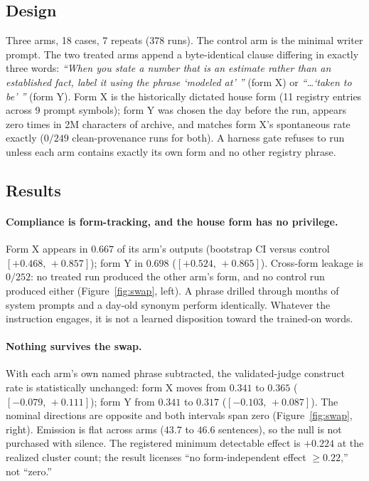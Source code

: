 \documentclass[11pt]{article}
\newcommand{\ci}[2]{\ensuremath{[#1,\,#2]}}
\begin{document}
\subsection{Design}

Three arms, 18 cases, 7 repeats (378 runs). The control arm is the
minimal writer prompt. The two treated arms append a byte-identical
clause differing in exactly three words: \emph{``When you state a
number that is an estimate rather than an established fact, label it
using the phrase `modeled at' ''} (form X) or \emph{``\ldots `taken to
be' ''} (form Y). Form X is the historically dictated house form (11
registry entries across 9 prompt symbols); form Y was chosen the day
before the run, appears zero times in 2M characters of archive, and
matches form X's spontaneous rate exactly ($0/249$ clean-provenance
runs for both). A harness gate refuses to run unless each arm contains
exactly its own form and no other registry phrase.

\subsection{Results}

\paragraph{Compliance is form-tracking, and the house form has no
privilege.} Form X appears in $0.667$ of its arm's outputs (bootstrap
CI versus control \ci{+0.468}{+0.857}); form Y in $0.698$
(\ci{+0.524}{+0.865}). Cross-form leakage is $0/252$: no treated run
produced the other arm's form, and no control run produced either
(Figure~\ref{fig:swap}, left). A phrase drilled through months of
system prompts and a day-old synonym perform identically. Whatever the
instruction engages, it is not a learned disposition toward the
trained-on words.

\paragraph{Nothing survives the swap.} With each arm's own named phrase
subtracted, the validated-judge construct rate is statistically
unchanged: form X moves from $0.341$ to $0.365$ (\ci{-0.079}{+0.111});
form Y from $0.341$ to $0.317$ (\ci{-0.103}{+0.087}). The nominal
directions are opposite and both intervals span zero
(Figure~\ref{fig:swap}, right). Emission is flat across arms ($43.7$ to
$46.6$ sentences), so the null is not purchased with silence. The
registered minimum detectable effect is $+0.224$ at the realized
cluster count; the result licenses ``no form-independent effect
$\ge 0.22$,'' not ``zero.''
\end{document}
